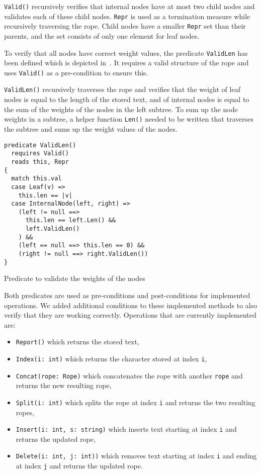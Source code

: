 \texttt{Valid()} recursively verifies that internal nodes have at most two child nodes and validates each of these child nodes.
\texttt{Repr} is used as a termination measure while recursively traversing the rope.
Child nodes have a smaller \texttt{Repr} set than their parents, and the set consists of only one element for leaf nodes.

To verify that all nodes have correct weight values, the predicate \texttt{ValidLen} has been defined which is depicted in~.
It requires a valid structure of the rope and uses \texttt{Valid()} as a pre-condition to ensure this.

\texttt{ValidLen()} recursively traverses the rope and verifies that the weight of leaf nodes is equal to the length of the stored text, and of internal nodes is equal to the sum of the weights of the nodes in the left subtree.
To sum up the node weights in a subtree, a helper function \texttt{Len()} needed to be written that traverses the subtree and sums up the weight values of the nodes.

\begin{listing}[h!]
\begin{verbatim}
predicate ValidLen()
  requires Valid()
  reads this, Repr
{
  match this.val
  case Leaf(v) =>
    this.len == |v|
  case InternalNode(left, right) =>
    (left != null ==>
      this.len == left.Len() &&
      left.ValidLen()
    ) &&
    (left == null ==> this.len == 0) &&
    (right != null ==> right.ValidLen())
}
\end{verbatim}
    \caption{Predicate to validate the weights of the nodes}
    \label{lst:rope-valid-len}
\end{listing}

Both predicates are used as pre-conditions and post-conditions for implemented operations.
We added additional conditions to these implemented methods to also verify that they are working correctly.
Operations that are currently implemented are:
\begin{itemize}
  \item \texttt{Report()} which returns the stored text,
  \item \texttt{Index(i: int)} which returns the character stored at index \texttt{i},
  \item \texttt{Concat(rope: Rope)} which concatenates the rope with another \texttt{rope} and returns the new resulting rope,
  \item \texttt{Split(i: int)} which splits the rope at index \texttt{i} and returns the two resulting ropes,
  \item \texttt{Insert(i: int, s: string)} which inserts text starting at index \texttt{i} and returns the updated rope,
  \item \texttt{Delete(i: int, j: int))} which removes text starting at index \texttt{i} and ending at index \texttt{j} and returns the updated rope.
\end{itemize}

